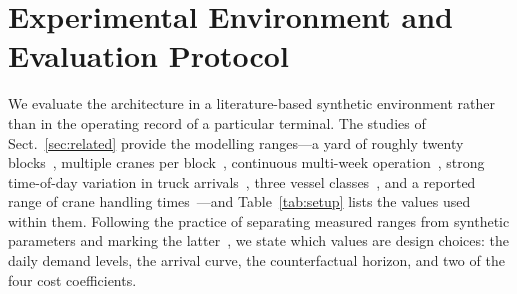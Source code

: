 \documentclass[a4paper]{llncs}
\begin{document}
\section{Experimental Environment and Evaluation Protocol}
\label{sec:env}
We evaluate the architecture in a literature-based synthetic environment
rather than in the operating record of a particular terminal. The
studies of Sect.~\ref{sec:related} provide the modelling ranges---a
yard of roughly twenty blocks~\cite{ref16}, multiple cranes per block~\cite{ref8}, continuous
multi-week operation~\cite{ref9}, strong time-of-day variation in truck
arrivals~\cite{ref13}, three vessel classes~\cite{ref16}, and a reported
range of crane handling times~\cite{ref9}---and Table~\ref{tab:setup}
lists the values used within them. Following the practice of separating measured ranges from synthetic
parameters and marking the latter~\cite{ref20}, we state which values are
design choices: the daily demand levels, the arrival curve, the
counterfactual horizon, and two of the four cost coefficients.
\end{document}
